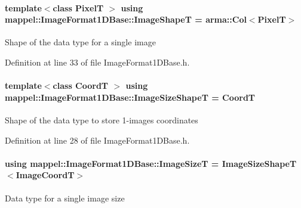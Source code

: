 \paragraph[{\texorpdfstring{Image\+ShapeT}{ImageShapeT}}]{\setlength{\rightskip}{0pt plus 5cm}template$<$class PixelT $>$ using {\bf mappel\+::\+Image\+Format1\+D\+Base\+::\+Image\+ShapeT} =  arma\+::\+Col$<$PixelT$>$\hspace{0.3cm}{\ttfamily [inherited]}}\hypertarget{classmappel_1_1ImageFormat1DBase_a20d315459b83c348b1465614699783b3}{}\label{classmappel_1_1ImageFormat1DBase_a20d315459b83c348b1465614699783b3}
Shape of the data type for a single image 

Definition at line 33 of file Image\+Format1\+D\+Base.\+h.

\paragraph[{\texorpdfstring{Image\+Size\+ShapeT}{ImageSizeShapeT}}]{\setlength{\rightskip}{0pt plus 5cm}template$<$class CoordT $>$ using {\bf mappel\+::\+Image\+Format1\+D\+Base\+::\+Image\+Size\+ShapeT} =  CoordT\hspace{0.3cm}{\ttfamily [inherited]}}\hypertarget{classmappel_1_1ImageFormat1DBase_ab722bbd223963861691ef038721b6e02}{}\label{classmappel_1_1ImageFormat1DBase_ab722bbd223963861691ef038721b6e02}
Shape of the data type to store 1-\/image\textquotesingle{}s coordinates 

Definition at line 28 of file Image\+Format1\+D\+Base.\+h.

\paragraph[{\texorpdfstring{Image\+SizeT}{ImageSizeT}}]{\setlength{\rightskip}{0pt plus 5cm}using {\bf mappel\+::\+Image\+Format1\+D\+Base\+::\+Image\+SizeT} =  {\bf Image\+Size\+ShapeT}$<${\bf Image\+CoordT}$>$\hspace{0.3cm}{\ttfamily [inherited]}}\hypertarget{classmappel_1_1ImageFormat1DBase_a6456bab2b26702022ee32ae19e90dcac}{}\label{classmappel_1_1ImageFormat1DBase_a6456bab2b26702022ee32ae19e90dcac}
Data type for a single image size 


